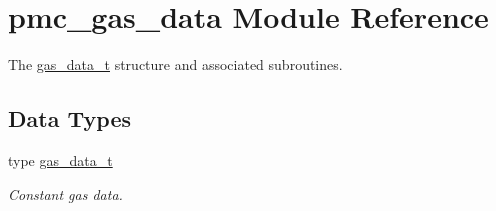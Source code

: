 \hypertarget{namespacepmc__gas__data}{}\section{pmc\+\_\+gas\+\_\+data Module Reference}
\label{namespacepmc__gas__data}


The \mbox{\hyperlink{structpmc__gas__data_1_1gas__data__t}{gas\+\_\+data\+\_\+t}} structure and associated subroutines.  


\subsection*{Data Types}
\begin{DoxyCompactItemize}
\item 
type \mbox{\hyperlink{structpmc__gas__data_1_1gas__data__t}{gas\+\_\+data\+\_\+t}}
\begin{DoxyCompactList}\small\item\em Constant gas data. \end{DoxyCompactList}\end{DoxyCompactItemize}
